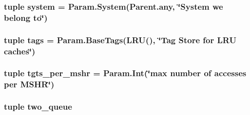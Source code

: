 \label{classBaseCache_1_1BaseCache_a377e5da8df1f89c5468c8b8cd07eac89}
\hypertarget{classBaseCache_1_1BaseCache_ab737471139f5a296e5b26e8a0e1b0744}{
\subsubsection[{system}]{\setlength{\rightskip}{0pt plus 5cm}tuple {\bf system} = Param.System(Parent.any, \char`\"{}System we belong to\char`\"{})}}
\label{classBaseCache_1_1BaseCache_ab737471139f5a296e5b26e8a0e1b0744}
\hypertarget{classBaseCache_1_1BaseCache_ae056df42c3ab581ce6db9f061a5695f0}{
\subsubsection[{tags}]{\setlength{\rightskip}{0pt plus 5cm}tuple {\bf tags} = Param.BaseTags({\bf LRU}(), \char`\"{}Tag Store for {\bf LRU} caches\char`\"{})}}
\label{classBaseCache_1_1BaseCache_ae056df42c3ab581ce6db9f061a5695f0}
\hypertarget{classBaseCache_1_1BaseCache_ad5c12e446f263e196690cea7686311e6}{
\subsubsection[{tgts\_\-per\_\-mshr}]{\setlength{\rightskip}{0pt plus 5cm}tuple {\bf tgts\_\-per\_\-mshr} = Param.Int(\char`\"{}max number of {\bf accesses} per {\bf MSHR}\char`\"{})}}
\label{classBaseCache_1_1BaseCache_ad5c12e446f263e196690cea7686311e6}
\hypertarget{classBaseCache_1_1BaseCache_a113d3ca0f38b0118d2e0c606bc1d742d}{
\subsubsection[{two\_\-queue}]{\setlength{\rightskip}{0pt plus 5cm}tuple {\bf two\_\-queue}}}
